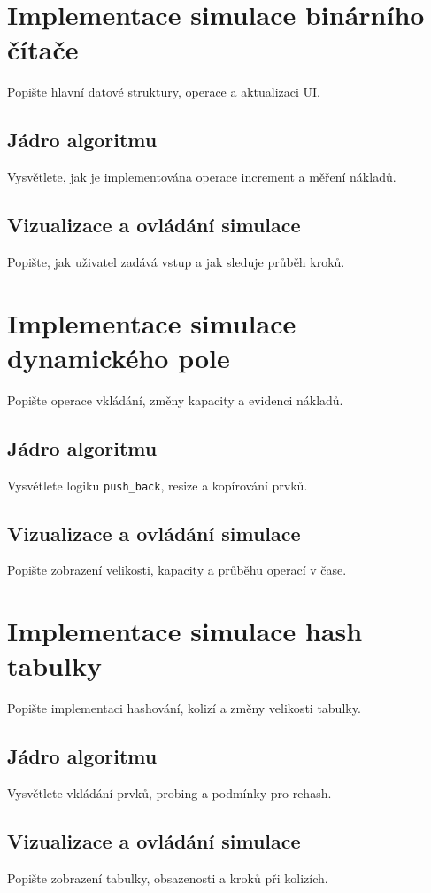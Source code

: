 \section{Implementace simulace binárního čítače}
Popište hlavní datové struktury, operace a aktualizaci UI.

\subsection{Jádro algoritmu}
Vysvětlete, jak je implementována operace increment a měření nákladů.

\subsection{Vizualizace a ovládání simulace}
Popište, jak uživatel zadává vstup a jak sleduje průběh kroků.

\section{Implementace simulace dynamického pole}
Popište operace vkládání, změny kapacity a evidenci nákladů.

\subsection{Jádro algoritmu}
Vysvětlete logiku \texttt{push\_back}, resize a kopírování prvků.

\subsection{Vizualizace a ovládání simulace}
Popište zobrazení velikosti, kapacity a průběhu operací v čase.

\section{Implementace simulace hash tabulky}
Popište implementaci hashování, kolizí a změny velikosti tabulky.

\subsection{Jádro algoritmu}
Vysvětlete vkládání prvků, probing a podmínky pro rehash.

\subsection{Vizualizace a ovládání simulace}
Popište zobrazení tabulky, obsazenosti a kroků při kolizích.

